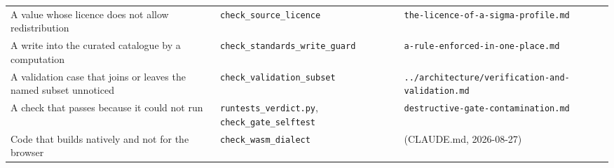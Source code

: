\documentclass[11pt,a4paper]{article}
\newcommand{\brk}[1]{\nolinkurl{#1}}
\begin{document}
\begin{table}[h]
\begin{tabularx}{\linewidth}{>{\raggedright\arraybackslash}X
                             >{\raggedright\arraybackslash}p{3.7cm}
                             >{\raggedright\arraybackslash}p{4.8cm}}
A value whose licence does not allow redistribution & \brk{check_source_licence}
& \brk{the-licence-of-a-sigma-profile.md} \\
A write into the curated catalogue by a computation &
\brk{check_standards_write_guard} & \brk{a-rule-enforced-in-one-place.md} \\
A validation case that joins or leaves the named subset unnoticed &
\brk{check_validation_subset} &
\brk{../architecture/verification-and-validation.md} \\
A check that passes because it could not run & \brk{runtests_verdict.py},
\brk{check_gate_selftest} & \brk{destructive-gate-contamination.md} \\
Code that builds natively and not for the browser &
\brk{check_wasm_dialect} & (CLAUDE.md, 2026-08-27) \\
\bottomrule
\end{tabularx}
\end{table}
\end{document}
